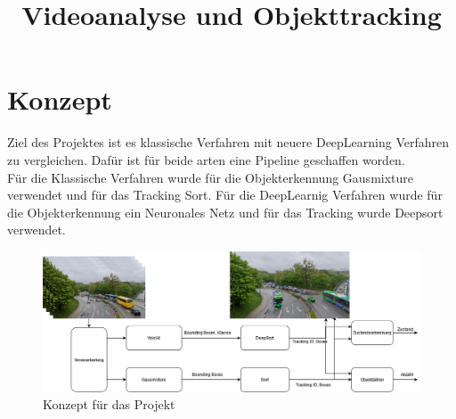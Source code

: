 \documentclass[conference]{IEEEtran}
\begin{document}
	
	\title{Videoanalyse und Objekttracking}
	
	\author{
	\and
	\and
	}

	
	\maketitle
	
	\begin{abstract}
		
	\end{abstract}
	
	\section{Konzept}
	Ziel des Projektes ist es klassische Verfahren mit neuere DeepLearning Verfahren zu vergleichen.
	Dafür ist für beide arten eine Pipeline geschaffen worden.\\
	Für die Klassische Verfahren wurde für die Objekterkennung Gausmixture verwendet und für das Tracking Sort. Für die DeepLearnig Verfahren wurde für die Objekterkennung ein Neuronales Netz  und für das Tracking wurde Deepsort verwendet.
	
	\begin{figure}[!h]
		\begin{center}
			\includegraphics[width=14cm]{Media/KonzeptVAOT.png}
			\caption{Konzept für das Projekt}
			\label{Konzept}
		\end{center}
	\end{figure}
	
\end{document}
